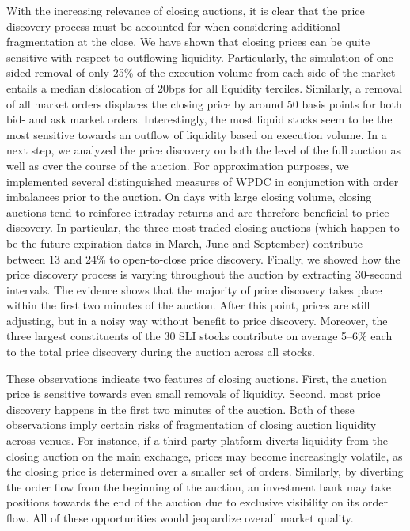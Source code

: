 \documentclass[11pt,a4paper]{article}
\begin{document}
    With the increasing relevance of closing auctions, it is clear that the price discovery process must be accounted for when considering additional fragmentation at the close. We have shown that closing prices can be quite sensitive with respect to outflowing liquidity. Particularly, the simulation of one-sided removal of only 25\% of the execution volume from each side of the market entails a median dislocation of 20bps for all liquidity terciles. Similarly, a removal of all market orders displaces the closing price by around 50 basis points for both bid- and ask market orders. Interestingly, the most liquid stocks seem to be the most sensitive towards an outflow of liquidity based on execution volume. In a next step, we analyzed the price discovery on both the level of the full auction as well as over the course of the auction. For approximation purposes, we implemented several distinguished measures of \acf{WPDC} in conjunction with order imbalances prior to the auction. On days with large closing volume, closing auctions tend to reinforce intraday returns and are therefore beneficial to price discovery. In particular, the three most traded closing auctions (which happen to be the future expiration dates in March, June and September) contribute between 13 and 24\% to open-to-close price discovery. Finally, we showed how the price discovery process is varying throughout the auction by extracting 30-second intervals. The evidence shows that the majority of price discovery takes place within the first two minutes of the auction. After this point, prices are still adjusting, but in a noisy way without benefit to price discovery. Moreover, the three largest constituents of the 30 \ac{SLI} stocks contribute on average 5--6\% each to the total price discovery during the auction across all stocks.

    These observations indicate two features of closing auctions. First, the auction price is sensitive towards even small removals of liquidity. Second, most price discovery happens in the first two minutes of the auction. Both of these observations imply certain risks of fragmentation of closing auction liquidity across venues. For instance, if a third-party platform diverts liquidity from the closing auction on the main exchange, prices may become increasingly volatile, as the closing price is determined over a smaller set of orders. Similarly, by diverting the order flow from the beginning of the auction, an investment bank may take positions towards the end of the auction due to exclusive visibility on its order flow. All of these opportunities would jeopardize overall market quality.
\end{document}
